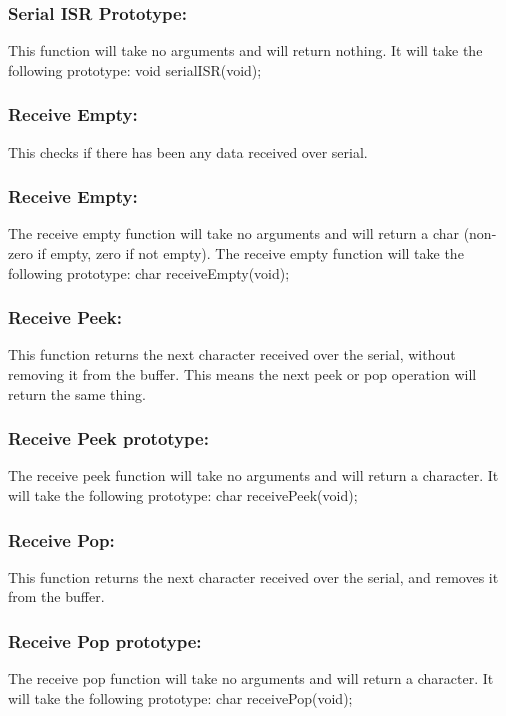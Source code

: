 \documentclass[]{article}
\begin{document}
\subsubsection{Serial ISR Prototype:}
This function will take no arguments and will return nothing. It will take the following prototype: \newline \newline
void serialISR(void);

\subsubsection{Receive Empty:}
This checks if there has been any data received over serial.

\subsubsection{Receive Empty:}
The receive empty function will take no arguments and will return a char (non-zero if empty, zero if not empty). The receive empty function will take the following prototype: \newline \newline
char receiveEmpty(void);

\subsubsection{Receive Peek:}
This function returns the next character received over the serial, without removing it from the buffer. This means the next peek or pop operation will return the same thing.

\subsubsection{Receive Peek prototype:}
The receive peek function will take no arguments and will return a character. It will take the following prototype: \newline \newline
char receivePeek(void);

\subsubsection{Receive Pop:}
This function returns the next character received over the serial, and removes it from the buffer.

\subsubsection{Receive Pop prototype:}
The receive pop function will take no arguments and will return a character. It will take the following prototype: \newline \newline
char receivePop(void);
\end{document}
